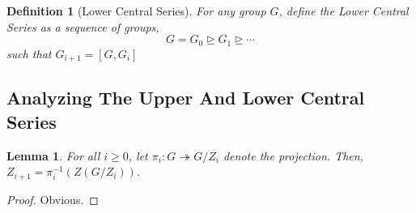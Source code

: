 \documentclass[12pt]{article}
\theoremstyle{thmstyle}
\newtheorem{lemma}[theorem]{Lemma}
\theoremstyle{defstyle}
\newtheorem{definition}[theorem]{Definition}
\renewcommand{\ge}{\geqslant}
\begin{document}
\begin{definition}[Lower Central Series]
    For any group $G$, define the \textit{Lower Central Series} as a sequence of groups,
    \begin{equation*}
        G = G_0\unrhd G_1\unrhd\cdots
    \end{equation*}
    such that $G_{i + 1} = [G,G_{i}]$
\end{definition}

\subsection{Analyzing The Upper And Lower Central Series}
\begin{lemma}
    For all $i\ge 0$, let $\pi_i:G\twoheadrightarrow G/Z_i$ denote the projection. Then, $Z_{i + 1} = \pi_i^{-1}\left(Z(G/Z_i)\right)$.
\end{lemma}
\begin{proof}
    Obvious.
\end{proof}
\end{document}
